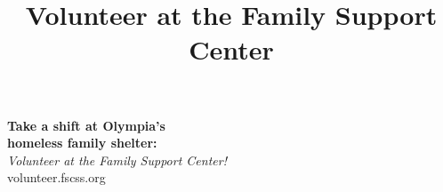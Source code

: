 \documentclass[14pt]{extarticle}
\title{Volunteer at the Family Support Center}
\begin{document}
\pagestyle{empty}
\noindent
{\Huge \bf Take a shift at Olympia's\\ homeless family shelter:}\\
{\LARGE \emph{Volunteer at the Family Support Center!}}\\
{\Huge {} \selectfont volunteer.fscss.org}\\

\end{document}
